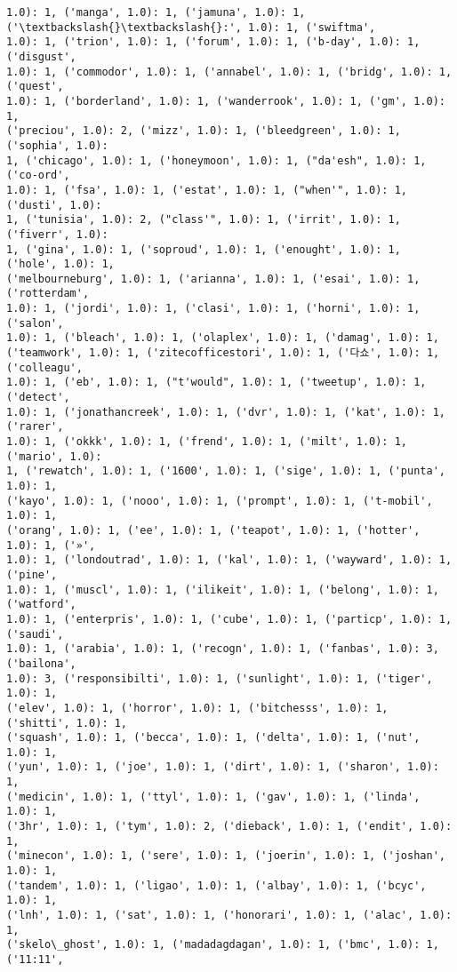 \documentclass[11pt]{article}
\begin{document}
\begin{Verbatim}[commandchars=\\\{\}]
1.0): 1, ('manga', 1.0): 1, ('jamuna', 1.0): 1, ('\textbackslash{}\textbackslash{}:', 1.0): 1, ('swiftma',
1.0): 1, ('trion', 1.0): 1, ('forum', 1.0): 1, ('b-day', 1.0): 1, ('disgust',
1.0): 1, ('commodor', 1.0): 1, ('annabel', 1.0): 1, ('bridg', 1.0): 1, ('quest',
1.0): 1, ('borderland', 1.0): 1, ('wanderrook', 1.0): 1, ('gm', 1.0): 1,
('preciou', 1.0): 2, ('mizz', 1.0): 1, ('bleedgreen', 1.0): 1, ('sophia', 1.0):
1, ('chicago', 1.0): 1, ('honeymoon', 1.0): 1, ("da'esh", 1.0): 1, ('co-ord',
1.0): 1, ('fsa', 1.0): 1, ('estat', 1.0): 1, ("when'", 1.0): 1, ('dusti', 1.0):
1, ('tunisia', 1.0): 2, ("class'", 1.0): 1, ('irrit', 1.0): 1, ('fiverr', 1.0):
1, ('gina', 1.0): 1, ('soproud', 1.0): 1, ('enought', 1.0): 1, ('hole', 1.0): 1,
('melbourneburg', 1.0): 1, ('arianna', 1.0): 1, ('esai', 1.0): 1, ('rotterdam',
1.0): 1, ('jordi', 1.0): 1, ('clasi', 1.0): 1, ('horni', 1.0): 1, ('salon',
1.0): 1, ('bleach', 1.0): 1, ('olaplex', 1.0): 1, ('damag', 1.0): 1,
('teamwork', 1.0): 1, ('zitecofficestori', 1.0): 1, ('다쇼', 1.0): 1, ('colleagu',
1.0): 1, ('eb', 1.0): 1, ("t'would", 1.0): 1, ('tweetup', 1.0): 1, ('detect',
1.0): 1, ('jonathancreek', 1.0): 1, ('dvr', 1.0): 1, ('kat', 1.0): 1, ('rarer',
1.0): 1, ('okkk', 1.0): 1, ('frend', 1.0): 1, ('milt', 1.0): 1, ('mario', 1.0):
1, ('rewatch', 1.0): 1, ('1600', 1.0): 1, ('sige', 1.0): 1, ('punta', 1.0): 1,
('kayo', 1.0): 1, ('nooo', 1.0): 1, ('prompt', 1.0): 1, ('t-mobil', 1.0): 1,
('orang', 1.0): 1, ('ee', 1.0): 1, ('teapot', 1.0): 1, ('hotter', 1.0): 1, ('»',
1.0): 1, ('londoutrad', 1.0): 1, ('kal', 1.0): 1, ('wayward', 1.0): 1, ('pine',
1.0): 1, ('muscl', 1.0): 1, ('ilikeit', 1.0): 1, ('belong', 1.0): 1, ('watford',
1.0): 1, ('enterpris', 1.0): 1, ('cube', 1.0): 1, ('particp', 1.0): 1, ('saudi',
1.0): 1, ('arabia', 1.0): 1, ('recogn', 1.0): 1, ('fanbas', 1.0): 3, ('bailona',
1.0): 3, ('responsibilti', 1.0): 1, ('sunlight', 1.0): 1, ('tiger', 1.0): 1,
('elev', 1.0): 1, ('horror', 1.0): 1, ('bitchesss', 1.0): 1, ('shitti', 1.0): 1,
('squash', 1.0): 1, ('becca', 1.0): 1, ('delta', 1.0): 1, ('nut', 1.0): 1,
('yun', 1.0): 1, ('joe', 1.0): 1, ('dirt', 1.0): 1, ('sharon', 1.0): 1,
('medicin', 1.0): 1, ('ttyl', 1.0): 1, ('gav', 1.0): 1, ('linda', 1.0): 1,
('3hr', 1.0): 1, ('tym', 1.0): 2, ('dieback', 1.0): 1, ('endit', 1.0): 1,
('minecon', 1.0): 1, ('sere', 1.0): 1, ('joerin', 1.0): 1, ('joshan', 1.0): 1,
('tandem', 1.0): 1, ('ligao', 1.0): 1, ('albay', 1.0): 1, ('bcyc', 1.0): 1,
('lnh', 1.0): 1, ('sat', 1.0): 1, ('honorari', 1.0): 1, ('alac', 1.0): 1,
('skelo\_ghost', 1.0): 1, ('madadagdagan', 1.0): 1, ('bmc', 1.0): 1, ('11:11',

\end{Verbatim}
\end{document}
